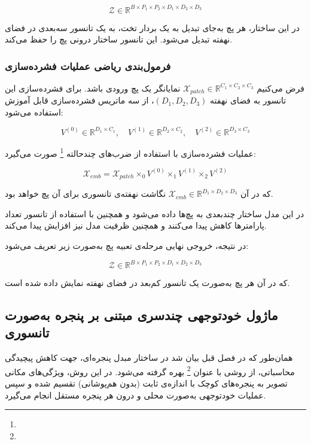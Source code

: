 \[
\mathcal{Z} \in \mathbb{R}^{B \times P_1 \times P_2 \times D_1 \times D_2 \times D_3}
\]

در این ساختار، هر پچ به‌جای تبدیل به یک بردار تخت، به یک تانسور سه‌بعدی در فضای نهفته تبدیل می‌شود. این تانسور ساختار درونی پچ را حفظ می‌کند.

\subsubsection*{فرمول‌بندی ریاضی عملیات فشرده‌سازی}

فرض می‌کنیم $\mathcal{X}_{patch} \in \mathbb{R}^{C_1 \times C_2 \times C_3}$ نمایانگر یک پچ ورودی باشد. برای فشرده‌سازی این تانسور به فضای نهفته $(D_1, D_2, D_3)$، از سه ماتریس فشرده‌سازی قابل آموزش استفاده می‌شود:

\[
V^{(0)} \in \mathbb{R}^{D_1 \times C_1}, \quad
V^{(1)} \in \mathbb{R}^{D_2 \times C_2}, \quad
V^{(2)} \in \mathbb{R}^{D_3 \times C_3}
\]

عملیات فشرده‌سازی با استفاده از ضرب‌های چندحالته \footnote{} صورت می‌گیرد:

\begin{equation}
	\mathcal{X}_{emb} = \mathcal{X}_{patch} \times_0 V^{(0)} \times_1 V^{(1)} \times_2 V^{(2)}
\end{equation}

که در آن $\mathcal{X}_{emb} \in \mathbb{R}^{D_1 \times D_2 \times D_3}$ نگاشت نهفته‌ی تانسوری برای آن پچ خواهد بود.

در این مدل ساختار چندبعدی به پچ‌ها داده می‌شود و همچنین با استفاده از تانسور تعداد پارامترها کاهش پیدا می‌کنند و همچنین ظرفیت مدل نیز افزایش پیدا می‌کند.

در نتیجه، خروجی نهایی مرحله‌ی تعبیه پچ به‌صورت زیر تعریف می‌شود:

\[
\mathcal{Z} \in \mathbb{R}^{B \times P_1 \times P_2 \times D_1 \times D_2 \times D_3}
\]

که در آن هر پچ به‌صورت یک تانسور کم‌بعد در فضای نهفته نمایش داده شده است.

\subsection{ماژول خودتوجهی چندسری مبتنی بر پنجره به‌صورت تانسوری}

همان‌طور که در فصل قبل بیان شد در ساختار مبدل پنجره‌ای، جهت کاهش پیچیدگی محاسباتی، از روشی با عنوان \footnote{} بهره گرفته می‌شود. در این روش، ویژگی‌های مکانی تصویر به پنجره‌های کوچک با اندازه‌ی ثابت (بدون هم‌پوشانی) تقسیم شده و سپس عملیات خودتوجهی به‌صورت محلی و درون هر پنجره مستقل انجام می‌گیرد.

